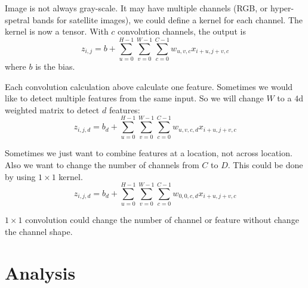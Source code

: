 \begin{example}
    Image is not always gray-scale. It may have multiple channels (RGB, or hyper-spetral bands for satellite images), we could define a kernel for each channel. The kernel is now a tensor. With $c$ convolution channels, the output is
\begin{equation}
    z_{i,j} = b + \sum_{u=0}^{H-1} \sum_{v=0}^{W-1} \sum_{c=0}^{C-1} w_{u,v,c} x_{i+u,j+v,c}
\end{equation}
    where $b$ is the bias.
\end{example}


\begin{example}
    Each convolution calculation above calculate one feature. Sometimes we would like to detect multiple features from the same input. So we will change $W$ to a $4$d weighted matrix to detect $d$ features:
    \begin{equation}
        z_{i,j,d} = b_d + \sum_{u=0}^{H-1} \sum_{v=0}^{W-1} \sum_{c=0}^{C-1} w_{u,v,c,d} x_{i+u,j+v,c}
    \end{equation}
\end{example}

\begin{example}
    Sometimes we just want to combine features at a location, not across location. Also we want to change the number of channels from $C$ to $D$. This could be done by using $1 \times 1$ kernel.
    \begin{equation}
        z_{i,j,d} = b_d + \sum_{u=0}^{H-1} \sum_{v=0}^{W-1} \sum_{c=0}^{C-1} w_{0,0,c,d} x_{i+u,j+v,c}
    \end{equation}
    
    $1 \times 1$ convolution could change the number of channel or feature without change the channel shape.
\end{example}





\section{Analysis}

